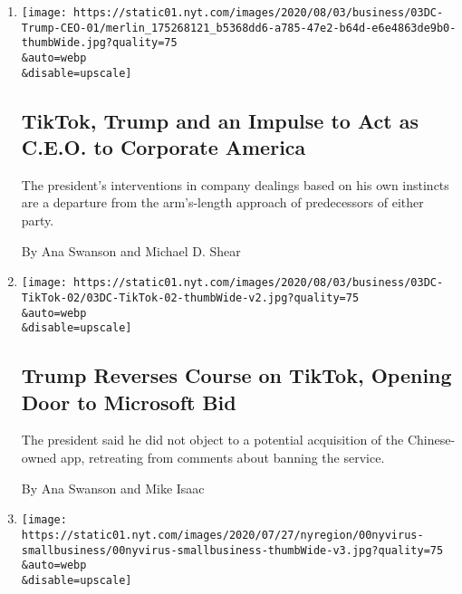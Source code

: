 \begin{enumerate}
\def\labelenumi{\arabic{enumi}.}
\item
  \href{/2020/08/03/business/economy/trump-tiktok-china-business.html}{}

  \texttt{[image: https://static01.nyt.com/images/2020/08/03/business/03DC-Trump-CEO-01/merlin\_175268121\_b5368dd6-a785-47e2-b64d-e6e4863de9b0-thumbWide.jpg?quality=75\\\&auto=webp\\\&disable=upscale]}

  \hypertarget{tiktok-trump-and-an-impulse-to-act-as-ceo-to-corporate-america}{%
  \subsection{TikTok, Trump and an Impulse to Act as C.E.O. to Corporate
  America}\label{tiktok-trump-and-an-impulse-to-act-as-ceo-to-corporate-america}}

  The president's interventions in company dealings based on his own
  instincts are a departure from the arm's-length approach of
  predecessors of either party.

  By Ana Swanson and Michael D. Shear
\item
  \href{/2020/08/03/technology/trump-tiktok-microsoft.html}{}

  \texttt{[image: https://static01.nyt.com/images/2020/08/03/business/03DC-TikTok-02/03DC-TikTok-02-thumbWide-v2.jpg?quality=75\\\&auto=webp\\\&disable=upscale]}

  \hypertarget{trump-reverses-course-on-tiktok-opening-door-to-microsoft-bid}{%
  \subsection{Trump Reverses Course on TikTok, Opening Door to Microsoft
  Bid}\label{trump-reverses-course-on-tiktok-opening-door-to-microsoft-bid}}

  The president said he did not object to a potential acquisition of the
  Chinese-owned app, retreating from comments about banning the service.

  By Ana Swanson and Mike Isaac
\item
  \href{/2020/08/03/nyregion/nyc-small-businesses-closing-coronavirus.html}{}

  \texttt{[image: https://static01.nyt.com/images/2020/07/27/nyregion/00nyvirus-smallbusiness/00nyvirus-smallbusiness-thumbWide-v3.jpg?quality=75\\\&auto=webp\\\&disable=upscale]}

  \hypertarget{one-third-of-new-yorks-small-businesses-may-be-gone-forever}{%
}
\end{enumerate}
